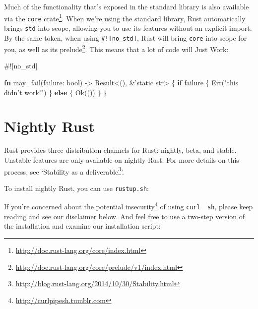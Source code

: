 \documentclass[a4paper,]{book}
\renewcommand*{\hypertarget}[3][\ar]{%
  \def\ar{#2}%
  \label{#1}%
  #3}
\newenvironment{Shaded}{\begin{snugshade}}{\end{snugshade}}
\newcommand{\KeywordTok}[1]{\textcolor[rgb]{0.13,0.29,0.53}{\textbf{{#1}}}}
\newcommand{\DataTypeTok}[1]{\textcolor[rgb]{0.13,0.29,0.53}{{#1}}}
\newcommand{\ConstantTok}[1]{\textcolor[rgb]{0.00,0.00,0.00}{{#1}}}
\newcommand{\StringTok}[1]{\textcolor[rgb]{0.31,0.60,0.02}{{#1}}}
\newcommand{\OtherTok}[1]{\textcolor[rgb]{0.56,0.35,0.01}{{#1}}}
\newcommand{\AttributeTok}[1]{\textcolor[rgb]{0.77,0.63,0.00}{{#1}}}
\newcommand{\NormalTok}[1]{{#1}}
\renewcommand{\href}[2]{#2\footnote{\url{#1}}}
\begin{document}
Much of the functionality that's exposed in the standard library is also
available via the
\href{http://doc.rust-lang.org/core/index.html}{\texttt{core} crate}.
When we're using the standard library, Rust automatically brings
\texttt{std} into scope, allowing you to use its features without an
explicit import. By the same token, when using
\texttt{\#!{[}no\_std{]}}, Rust will bring \texttt{core} into scope for
you, as well as
\href{http://doc.rust-lang.org/core/prelude/v1/index.html}{its prelude}.
This means that a lot of code will Just Work:

\begin{Shaded}
\begin{Highlighting}[]
\AttributeTok{#![}\NormalTok{no_std}\AttributeTok{]}

\KeywordTok{fn} \NormalTok{may_fail(failure: }\DataTypeTok{bool}\NormalTok{) -> }\DataTypeTok{Result}\NormalTok{<(), &}\OtherTok{'static} \DataTypeTok{str}\NormalTok{> \{}
    \KeywordTok{if} \NormalTok{failure \{}
        \ConstantTok{Err}\NormalTok{(}\StringTok{"this didn’t work!"}\NormalTok{)}
    \NormalTok{\} }\KeywordTok{else} \NormalTok{\{}
        \ConstantTok{Ok}\NormalTok{(())}
    \NormalTok{\}}
\NormalTok{\}}
\end{Highlighting}
\end{Shaded}

\hypertarget{sec--nightly-rust}{\chapter{Nightly
Rust}\label{sec--nightly-rust}}

Rust provides three distribution channels for Rust: nightly, beta, and
stable. Unstable features are only available on nightly Rust. For more
details on this process, see
`\href{http://blog.rust-lang.org/2014/10/30/Stability.html}{Stability as
a deliverable}'.

To install nightly Rust, you can use \texttt{rustup.sh}:

\begin{Shaded}
\end{Shaded}

If you're concerned about the
\href{http://curlpipesh.tumblr.com}{potential insecurity} of using
\texttt{curl\ \textbar{}\ sh}, please keep reading and see our
disclaimer below. And feel free to use a two-step version of the
installation and examine our installation script:
\end{document}

